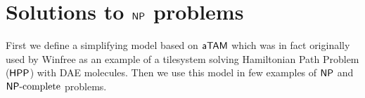 \chapter{Solutions to $\mathsf{NP}$ problems}   %
\label{chap:problems}




First we define a simplifying model based on $\mathsf{aTAM}$ which was in fact originally used by Winfree \cite{winfree_phd} as an example of a tilesystem solving Hamiltonian Path Problem ($\sf HPP$) with DAE molecules. Then we use this model in few examples of $\mathsf{NP}$ and $\mathsf{NP}\textnormal{-complete}$ problems.








